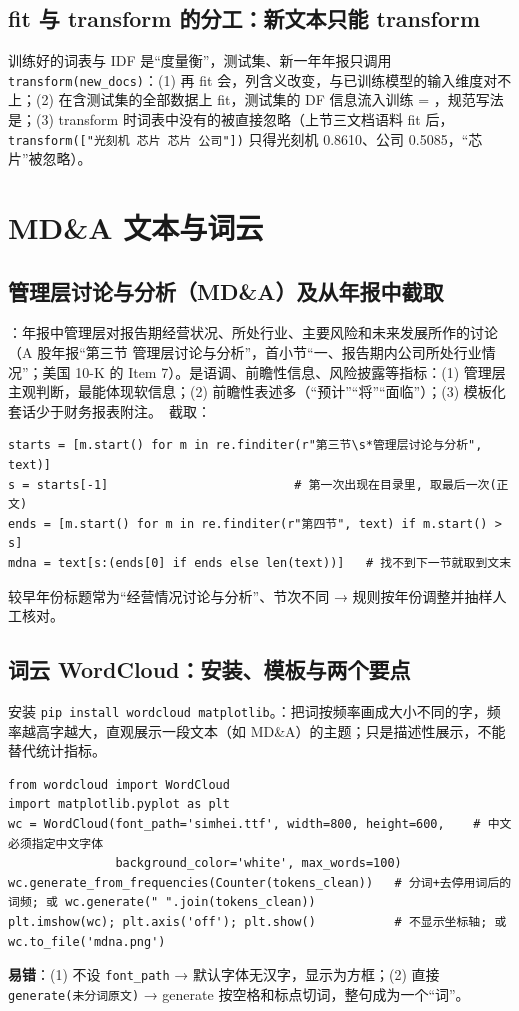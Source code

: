 \subsection{fit 与 transform 的分工：新文本只能 transform}
训练好的词表与 IDF 是“度量衡”，测试集、新一年年报只调用 \texttt{transform(new\_docs)}：(1) 再 fit 会，列含义改变，与已训练模型的输入维度对不上；(2) 在含测试集的全部数据上 fit，测试集的 DF 信息流入训练 = ，规范写法是；(3) transform 时词表中没有的被直接忽略（上节三文档语料 fit 后，\texttt{transform(["光刻机 芯片 芯片 公司"])} 只得光刻机 0.8610、公司 0.5085，“芯片”被忽略）。

\section{MD\&A 文本与词云}

\subsection{管理层讨论与分析（MD\&A）及从年报中截取}
：年报中管理层对报告期经营状况、所处行业、主要风险和未来发展所作的讨论（A 股年报“第三节 管理层讨论与分析”，首小节“一、报告期内公司所处行业情况”；美国 10-K 的 Item 7）。是语调、前瞻性信息、风险披露等指标：(1) 管理层主观判断，最能体现软信息；(2) 前瞻性表述多（“预计”“将”“面临”）；(3) 模板化套话少于财务报表附注。\tagext\ 截取：
\begin{lstlisting}[style=pyD08a]
starts = [m.start() for m in re.finditer(r"第三节\s*管理层讨论与分析", text)]
s = starts[-1]                          # 第一次出现在目录里, 取最后一次(正文)
ends = [m.start() for m in re.finditer(r"第四节", text) if m.start() > s]
mdna = text[s:(ends[0] if ends else len(text))]   # 找不到下一节就取到文末
\end{lstlisting}
较早年份标题常为“经营情况讨论与分析”、节次不同 → 规则按年份调整并抽样人工核对。

\subsection{词云 WordCloud：安装、模板与两个要点}
安装 \texttt{pip install wordcloud matplotlib}。：把词按频率画成大小不同的字，频率越高字越大，直观展示一段文本（如 MD\&A）的主题；只是描述性展示，不能替代统计指标。
\begin{lstlisting}[style=pyD08a]
from wordcloud import WordCloud
import matplotlib.pyplot as plt
wc = WordCloud(font_path='simhei.ttf', width=800, height=600,    # 中文必须指定中文字体
               background_color='white', max_words=100)
wc.generate_from_frequencies(Counter(tokens_clean))   # 分词+去停用词后的词频; 或 wc.generate(" ".join(tokens_clean))
plt.imshow(wc); plt.axis('off'); plt.show()           # 不显示坐标轴; 或 wc.to_file('mdna.png')
\end{lstlisting}
\textbf{易错}：(1) 不设 \texttt{font\_path} → 默认字体无汉字，显示为方框；(2) 直接 \texttt{generate(未分词原文)} → generate 按空格和标点切词，整句成为一个“词”。
\endgroup
